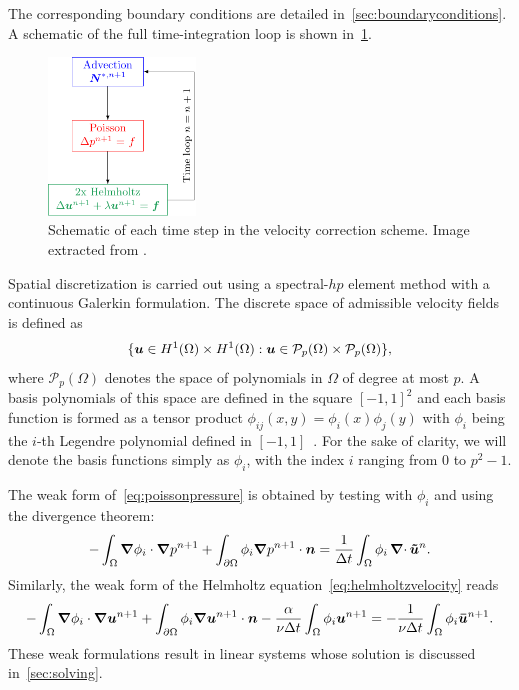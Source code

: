 \documentclass[../main.tex]{subfiles}
\begin{document}
The corresponding boundary conditions are detailed in~\cref{sec:boundaryconditions}. A schematic of the full time-integration loop is shown in~\cref{fig:vcs2d}.

\begin{figure}[ht]
	\centering
	\includegraphics[width=0.35\textwidth]{../../Images/vcs2d.pdf}
	\caption{Schematic of each time step in the velocity correction scheme. Image extracted from \cite{nektaruserguide}.}
	\label{fig:vcs2d}
\end{figure}

Spatial discretization is carried out using a spectral-$hp$ element method with a continuous Galerkin formulation. The discrete space of admissible velocity fields is defined as
\begin{equation}
	\{\bm{u} \in H^1(\Omega)\times H^1(\Omega): \bm{u} \in \mathcal{P}_p(\Omega)\times \mathcal{P}_p(\Omega)\},
\end{equation}
where $\mathcal{P}_p(\Omega)$ denotes the space of polynomials in $\Omega$ of degree at most $p$. A basis polynomials of this space are defined in the square $[-1,1]^2$ and each basis function is formed as a tensor product $\phi_{ij}(x,y) = \phi_i(x)\phi_j(y)$ with $\phi_i$ being the $i$-th Legendre polynomial defined in $[-1,1]$~\cite{spectralhpSpencerBible}. For the sake of clarity, we will denote the basis functions simply as $\phi_{i}$, with the index $i$ ranging from 0 to $p^2-1$.

The weak form of~\eqref{eq:poissonpressure} is obtained by testing with $\phi_{i}$ and using the divergence theorem:
\begin{equation}
	 -\int_\Omega \grad \phi_{i} \cdot \grad p^{n+1} +\int_{\partial\Omega} \phi_{i} \grad p^{n+1} \cdot \bm{n} = \frac{1}{\Delta t} \int_\Omega \phi_{i} \operatorname{\bm{\nabla}\cdot} \bm{\tilde{u}}^n.
	 \label{eq:weakpoissonpressure}
\end{equation}
Similarly, the weak form of the Helmholtz equation~\eqref{eq:helmholtzvelocity} reads
\begin{equation}
	-\int_\Omega \grad \phi_{i} \cdot \grad \bm{u}^{n+1} + \int_{\partial\Omega} \phi_{i} \grad \bm{u}^{n+1} \cdot \bm{n} - \frac{\alpha}{\nu \Delta t} \int_\Omega \phi_{i} \bm{u}^{n+1} = -\frac{1}{\nu \Delta t} \int_\Omega \phi_{i} \bm{\bar{u}}^{n+1}.
	\label{eq:weakhelmholtzvelocity}
\end{equation}
These weak formulations result in linear systems whose solution is discussed in~\cref{sec:solving}.
\end{document}
